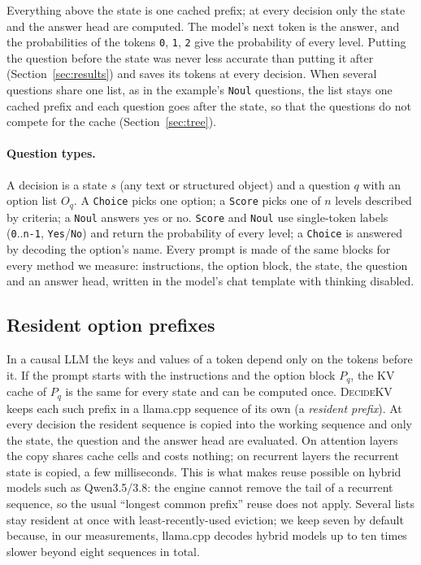 \documentclass[11pt]{article}
\newcommand{\dkv}{\textsc{DecideKV}}
\begin{document}
Everything above the state is one cached prefix; at every decision only the state and the answer head are computed.
The model's next token is the answer, and the probabilities of the tokens \texttt{0}, \texttt{1}, \texttt{2} give the
probability of every level. Putting the question before the state was never less accurate than putting it after
(Section~\ref{sec:results}) and saves its tokens at every decision. When several questions share one list, as in
the example's \texttt{Noul} questions, the list stays one cached prefix and each question goes after the state, so
that the questions do not compete for the cache (Section~\ref{sec:tree}).

\paragraph{Question types.} A decision is a state $s$ (any text or structured object) and a question $q$ with an option list $O_q$. A
\texttt{Choice} picks one option; a \texttt{Score} picks one of $n$ levels described by criteria; a \texttt{Noul}
answers yes or no. \texttt{Score} and \texttt{Noul} use single-token labels (\texttt{0}..\texttt{n-1}, \texttt{Yes}/\texttt{No})
and return the probability of every level; a \texttt{Choice} is answered by decoding the option's name. Every prompt
is made of the same blocks for every method we measure: instructions, the option block, the state, the question and
an answer head, written in the model's chat template with thinking disabled.

\subsection{Resident option prefixes}\label{sec:resident}
In a causal LLM the keys and values of a token depend only on the tokens before it. If the prompt starts with the
instructions and the option block $P_q$, the KV cache of $P_q$ is the same for every state and can be computed once.
\dkv{} keeps each such prefix in a llama.cpp sequence of its own (a \emph{resident prefix}). At every decision the
resident sequence is copied into the working sequence and only the state, the question and the answer head are
evaluated. On attention layers the copy shares cache cells and costs nothing; on recurrent layers the recurrent state
is copied, a few milliseconds. This is what makes reuse possible on hybrid models such as Qwen3.5/3.8: the engine
cannot remove the tail of a recurrent sequence, so the usual ``longest common prefix'' reuse does not apply. Several
lists stay resident at once with least-recently-used eviction; we keep seven by default because, in our measurements,
llama.cpp decodes hybrid models up to ten times slower beyond eight sequences in total.
\end{document}
